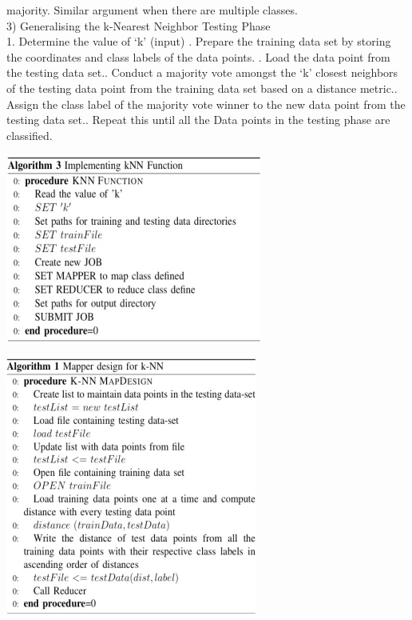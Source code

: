 \documentclass[11pt,article]{memoir}
\begin{document}
\begin{flushleft}
majority. Similar argument when there are multiple classes.\linebreak
\\
3) Generalising the k-Nearest Neighbor Testing Phase \\
1. Determine the value of ‘k’ (input) . Prepare the training data set by storing the coordinates and class labels of the data points. . Load the data point from the testing data set.. Conduct a majority vote amongst the ‘k’ closest
neighbors of the testing data point from the training
data set based on a distance metric.. Assign the class label of the majority vote winner to
the new data point from the testing data set.. Repeat this until all the Data points in the testing
phase are classified.\linebreak

	\includegraphics{driver.png}
	
	\includegraphics{map.png}


\end{flushleft}
\end{document}
